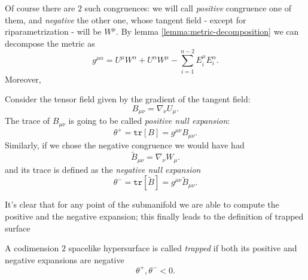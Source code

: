 Of course there are \(2\) such congruences: we will call \emph{positive} congruence one of them, and \emph{negative} the other one, whose tangent field - except for riparametrization - will be \(W^{\mu}\). By lemma \ref{lemma:metric-decomposition} we can decompose the metric as 
\[
g^{\mu\alpha} = U^{\mu}W^{\alpha} + U^{\alpha}W^{\mu} - \sum_{i=1}^{n - 2}E_i^{\mu}E_i^{\alpha}.
\]
Moreover,
\begin{definition}
	 Consider the tensor field given by the gradient of the tangent field:
	\[
	B_{\mu\nu} = \nabla_{\nu}U_{\mu}.
	\]
	The trace of \(B_{\mu\nu}\) is going to be called \emph{positive null expansion}:
	\[
	\theta^{+} = \texttt{tr}\left[B\right] = g^{\mu\nu}B_{\mu\nu}.
	\]
	Similarly, if we chose the negative congruence we would have had
	\[
	\tilde{B}_{\mu\nu} = \nabla_{\nu}W_{\mu}.
	\]
	and its trace is defined as the \emph{negative null expansion}
	\[
	\theta^{-} = \texttt{tr}\left[\tilde{B}\right] = g^{\mu\nu}\tilde{B}_{\mu\nu}.
	\]
\end{definition}

It's clear that for any point of the submanifold we are able to compute the positive and the negative expansion; this finally leads to the definition of trapped surface
\begin{definition}
	A codimension \(2\) spacelike hypersurface is called \emph{trapped} if both its positive and negative expansions are negative
	\[
	\theta^+ , \theta^- < 0.
	\]
\end{definition}

